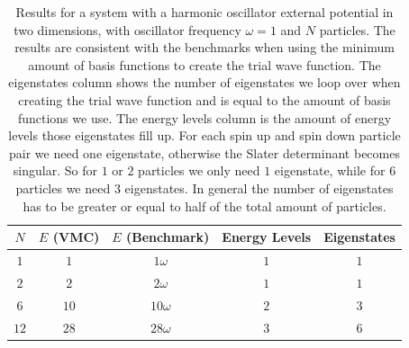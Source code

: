 \documentclass[../main.tex]{subfiles}
\begin{document}
\begin{table}[!ht]
  \centering
  \begin{tabular}{ | c | c | c | c | c | }
    \hline
    $N$ & $E$ (VMC) & $E$ (Benchmark) &  Energy Levels & Eigenstates\\*
    \hline
    $1$ & $1$ & $1\omega$ & $1$ & $1$ \\*
    \hline
    $2$ & $2$ & $2\omega$ & $1$ & $1$ \\*
    \hline
    $6$ & $10$ & $10\omega$ & $2$ & $3$ \\*
    \hline
    $12$ & $28$ & $28\omega$ & $3$ & $6$ \\*
    \hline
  \end{tabular}
  \caption{Results for a system with a harmonic oscillator external potential in two dimensions, with oscillator frequency $\omega = 1$ and $N$ particles. The results are consistent with the benchmarks when using the minimum amount of basis functions to create the trial wave function. The eigenstates column shows the number of eigenstates we loop over when creating the trial wave function and is equal to the amount of basis functions we use. The energy levels column is the amount of energy levels those eigenstates fill up. For each spin up and spin down particle pair we need one eigenstate, otherwise the Slater determinant becomes singular. So for $1$ or $2$ particles we only need $1$ eigenstate, while for $6$ particles we need $3$ eigenstates. In general the number of eigenstates has to be greater or equal to half of the total amount of particles.}
  \label{tab:RegHOTest2D}
\end{table}
\end{document}
